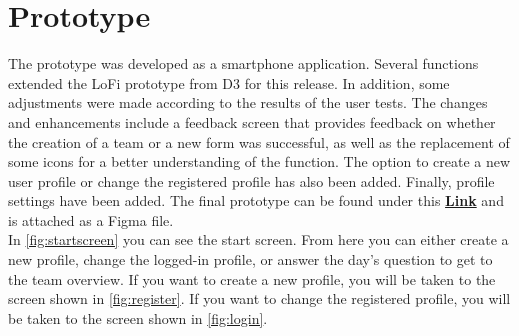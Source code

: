 \documentclass[11pt]{article}
\begin{document}
\clearpage

\section{Prototype}
The prototype was developed as a smartphone application. Several functions extended the LoFi prototype from D3 for this release. In addition, some adjustments were made according to the results of the user tests. The changes and enhancements include a feedback screen that provides feedback on whether the creation of a team or a new form was successful, as well as the replacement of some icons for a better understanding of the function. The option to create a new user profile or change the registered profile has also been added. Finally, profile settings have been added. The final prototype can be found under this \href{https://www.figma.com/proto/eesoN637wOm4ooDvH1GrsL/Mood-Tracker?type=design&node-id=33-360&t=20IVLZwIw9F8b4pc-1&scaling=min-zoom&page-id=0%3A1&starting-point-node-id=33%3A360&mode=design}{\textbf{Link}} and is attached as a Figma file.\\
In \autoref{fig:startscreen} you can see the start screen. From here you can either create a new profile, change the logged-in profile, or answer the day's question to get to the team overview. If you want to create a new profile, you will be taken to the screen shown in \autoref{fig:register}. If you want to change the registered profile, you will be taken to the screen shown in \autoref{fig:login}.
\end{document}

